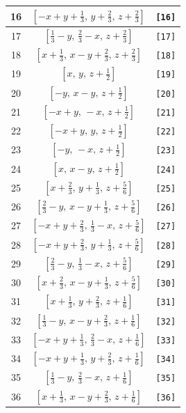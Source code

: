 \documentclass[fleqn,8pt]{jsarticle}
\begin{document}
\begin{longtable}{ccc}
16 & $\left[ - x + y + \frac{1}{3},\, y + \frac{2}{3},\, z + \frac{2}{3} \right]$ & {\tt [16]} \\ \hline
17 & $\left[ \frac{1}{3} - y,\, \frac{2}{3} - x,\, z + \frac{2}{3} \right]$ & {\tt [17]} \\ \hline
18 & $\left[ x + \frac{1}{3},\, x - y + \frac{2}{3},\, z + \frac{2}{3} \right]$ & {\tt [18]} \\ \hline
19 & $\left[ x,\, y,\, z + \frac{1}{2} \right]$ & {\tt [19]} \\ \hline
20 & $\left[ - y,\, x - y,\, z + \frac{1}{2} \right]$ & {\tt [20]} \\ \hline
21 & $\left[ - x + y,\, - x,\, z + \frac{1}{2} \right]$ & {\tt [21]} \\ \hline
22 & $\left[ - x + y,\, y,\, z + \frac{1}{2} \right]$ & {\tt [22]} \\ \hline
23 & $\left[ - y,\, - x,\, z + \frac{1}{2} \right]$ & {\tt [23]} \\ \hline
24 & $\left[ x,\, x - y,\, z + \frac{1}{2} \right]$ & {\tt [24]} \\ \hline
25 & $\left[ x + \frac{2}{3},\, y + \frac{1}{3},\, z + \frac{5}{6} \right]$ & {\tt [25]} \\ \hline
26 & $\left[ \frac{2}{3} - y,\, x - y + \frac{1}{3},\, z + \frac{5}{6} \right]$ & {\tt [26]} \\ \hline
27 & $\left[ - x + y + \frac{2}{3},\, \frac{1}{3} - x,\, z + \frac{5}{6} \right]$ & {\tt [27]} \\ \hline
28 & $\left[ - x + y + \frac{2}{3},\, y + \frac{1}{3},\, z + \frac{5}{6} \right]$ & {\tt [28]} \\ \hline
29 & $\left[ \frac{2}{3} - y,\, \frac{1}{3} - x,\, z + \frac{5}{6} \right]$ & {\tt [29]} \\ \hline
30 & $\left[ x + \frac{2}{3},\, x - y + \frac{1}{3},\, z + \frac{5}{6} \right]$ & {\tt [30]} \\ \hline
31 & $\left[ x + \frac{1}{3},\, y + \frac{2}{3},\, z + \frac{1}{6} \right]$ & {\tt [31]} \\ \hline
32 & $\left[ \frac{1}{3} - y,\, x - y + \frac{2}{3},\, z + \frac{1}{6} \right]$ & {\tt [32]} \\ \hline
33 & $\left[ - x + y + \frac{1}{3},\, \frac{2}{3} - x,\, z + \frac{1}{6} \right]$ & {\tt [33]} \\ \hline
34 & $\left[ - x + y + \frac{1}{3},\, y + \frac{2}{3},\, z + \frac{1}{6} \right]$ & {\tt [34]} \\ \hline
35 & $\left[ \frac{1}{3} - y,\, \frac{2}{3} - x,\, z + \frac{1}{6} \right]$ & {\tt [35]} \\ \hline
36 & $\left[ x + \frac{1}{3},\, x - y + \frac{2}{3},\, z + \frac{1}{6} \right]$ & {\tt [36]} \\
\end{longtable}
\end{document}
